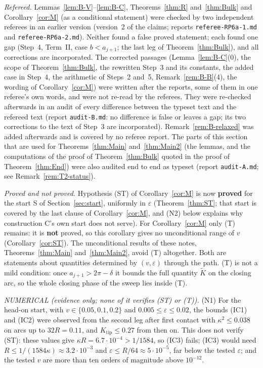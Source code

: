 \begin{remark}[Status]\label{rem:B-status}
\emph{Refereed.} Lemmas~\ref{lem:B-V}--\ref{lem:B-C}, Theorems~\ref{thm:R} and~\ref{thm:Bulk} and Corollary~\ref{cor:M} (as a
conditional statement) were checked by two independent referees in an earlier version (version~2 of the claims; reports
\texttt{referee-RP6a-1.md} and \texttt{referee-RP6a-2.md}). Neither found a false proved statement; each found one gap (Step~4,
Term~II, case $b<a_{j+1}$; the last leg of Theorem~\ref{thm:Bulk}), and all corrections are incorporated. The corrected passages
(Lemma~\ref{lem:B-C}(0), the scope of Theorem~\ref{thm:Bulk}, the rewritten Step~3 and its constants, the added case in Step~4,
the arithmetic of Steps~2 and~5, Remark~\ref{rem:B-B}(4), the wording of Corollary~\ref{cor:M}) were written after the reports,
some of them in one referee's own words, and were not re-read by the referees. They were re-checked afterwards in an audit of
every difference between the typeset text and the refereed text (report \texttt{audit-B.md}: no difference is false or leaves a
gap; its two corrections to the text of Step~3 are incorporated). Remark~\ref{rem:B-relaxed} was added afterwards and is
covered by no referee report. The parts of this section that are used for Theorems~\ref{thm:Main} and~\ref{thm:Main2} (the lemmas, and the
computations of the proof of Theorem~\ref{thm:Bulk} quoted in the proof of Theorem~\ref{thm:End}) were also audited end to end
as typeset (report \texttt{audit-A.md}; see Remark~\ref{rem:T2-status}).

\emph{Proved and not proved.} Hypothesis \textup{(ST)} of Corollary~\ref{cor:M} is now \textbf{proved} for the start S of
Section~\ref{sec:start}, uniformly in $\varepsilon$ (Theorem~\ref{thm:ST}; that start is covered by the last clause of
Corollary~\ref{cor:M}, and (N2) below explains why construction C's own start does not serve). For Corollary~\ref{cor:M} only \textup{(T)} remains: it is
\textbf{not} proved, so this corollary gives no unconditional range of $v$ (Corollary~\ref{cor:ST}). The unconditional results
of these notes, Theorems~\ref{thm:Main} and~\ref{thm:Main2}, avoid \textup{(T)} altogether. Both are statements about
quantities determined by $(v,\varepsilon)$ through the path.
\textup{(T)} is not a mild condition: once $a_{j+1}>2\pi-\delta$ it bounds the full quantity $\tilde K$ on the closing arc, so the
whole closing phase of the sweep lies inside \textup{(T)}.

\emph{NUMERICAL (evidence only; none of it verifies \textup{(ST)} or \textup{(T)}).}
(N1) For the head-on start, with $v\in\{0.05,0.1,0.2\}$ and $0.005\le\varepsilon\le0.02$, the bounds (IC1) and (IC2) were observed from the
second leg after first contact with $\kappa^2\le0.038$ on arcs up to $32R=0.11$, and $K_{\mathrm{tip}}\le0.27$ from then on. This does not
verify \textup{(ST)}: these values give $\kappa R=6.7\cdot10^{-4}>1/1584$, so (IC3) fails; (IC3) would need
$R\le1/(1584\kappa)\approx3.2\cdot10^{-3}$ and $\varepsilon\le R/64\approx5\cdot10^{-5}$, far below the tested $\varepsilon$; and
the tested $v$ are more than ten orders of magnitude above $10^{-12}$.


\end{remark}
